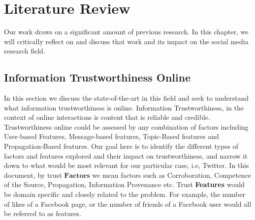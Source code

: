 \chapter{Literature Review}
Our work draws on a significant amount of previous research. In this chapter, we will critically reflect on and discuss that work and its impact on the social media research field.
\section{Information Trustworthiness Online}
In this section we discuss the state-of-the-art in this field and seek to understand what information trustworthiness is online. Information Trustworthiness, in the context of online interactions is content that is reliable and credible. Trustworthiness online could be assessed by any combination of factors including User-based Features, Message-based features, Topic-Based features and Propagation-Based features\cite{12}. Our goal here is to identify the different types of factors and features explored and their impact on trustworthiness, and narrow it down to what would be most relevant for our particular case, i.e, Twitter. In this document, by trust $\mathbf{Factors}$ we mean factors such as Corroboration, Competence of the Source, Propagation, Information Provenance etc. Trust \textbf{Features} would be domain specific and closely related to the problem. For example, the number of likes of a Facebook page, or the number of friends of a Facebook user would all be referred to as features.
